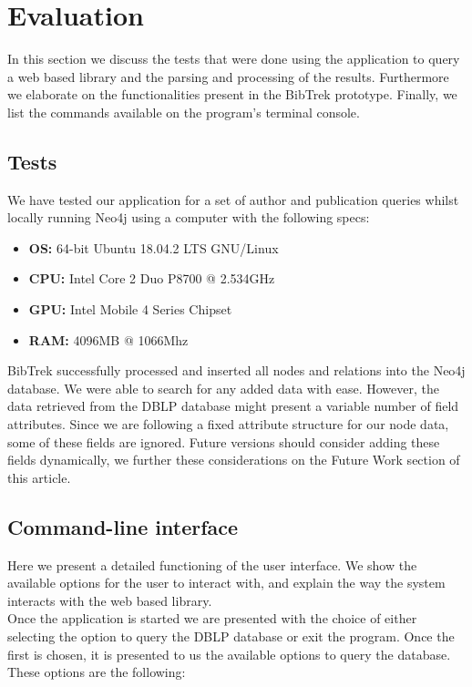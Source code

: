 \documentclass[twocolumn]{article}
\begin{document}
\section{Evaluation}
In this section we discuss the tests that were done using the application to query a web based library and the parsing and processing of the results. Furthermore we elaborate on the functionalities present in the BibTrek prototype. Finally, we list the commands available on the program's terminal console.

\subsection{Tests}
We have tested our application for a set of author and publication queries whilst locally running Neo4j using a computer with the following specs:
\begin{itemize}
\item \textbf{OS:} 64-bit Ubuntu 18.04.2 LTS GNU/Linux 
\item \textbf{CPU:} Intel Core 2 Duo P8700 @ 2.534GHz 
\item \textbf{GPU:} Intel Mobile 4 Series Chipset
\item \textbf{RAM:} 4096MB @ 1066Mhz 
\end{itemize}
BibTrek successfully processed and inserted all nodes and relations into the Neo4j database. We were able to search for any added data with ease. However, the data retrieved from the DBLP database might present a variable number of field attributes. Since we are following a fixed attribute structure for our node data, some of these fields are ignored. Future versions should consider adding these fields dynamically, we further these considerations on the Future Work section of this article.
\subsection{Command-line interface}
Here we present a detailed functioning of the user interface. We show the available options for the user to interact with, and explain the way the system interacts with the web based library.
\\[1\baselineskip]
Once the application is started we are presented with the choice of either selecting the option to query the DBLP database or exit the program. Once the first is chosen, it is presented to us the available options to query the database. These options are the following:
\end{document}
